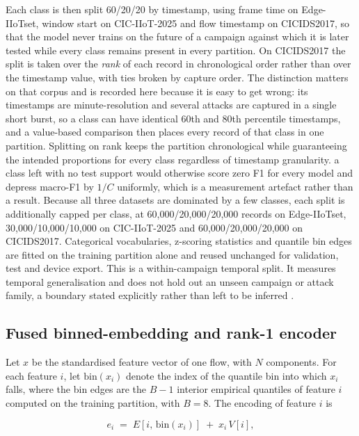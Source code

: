 \documentclass[10pt,letterpaper,twocolumn]{article}
\begin{document}
Each class is then split 60/20/20 by timestamp, using frame time on
Edge-IIoTset, window start on CIC-IIoT-2025 and flow timestamp on CICIDS2017,
so that the model never trains on the future of a campaign against which it is
later tested while every class remains present in every partition. On
CICIDS2017 the split is taken over the \emph{rank} of each record in
chronological order rather than over the timestamp value, with ties broken by
capture order. The distinction matters on that corpus and is recorded here
because it is easy to get wrong: its timestamps are minute-resolution and
several attacks are captured in a single short burst, so a class can have
identical 60th and 80th percentile timestamps, and a value-based comparison
then places every record of that class in one partition. Splitting on rank
keeps the partition chronological while guaranteeing the intended proportions
for every class regardless of timestamp granularity. a class left with no test
support would otherwise score zero F1 for every model and depress macro-F1 by
$1/C$ uniformly, which is a measurement artefact rather than a result. Because
all three datasets are dominated by a few classes, each split is additionally
capped per class, at 60,000/20,000/20,000 records on Edge-IIoTset,
30,000/10,000/10,000 on CIC-IIoT-2025 and 60,000/20,000/20,000 on CICIDS2017. Categorical
vocabularies, z-scoring statistics and quantile bin edges are fitted on the
training partition alone and reused unchanged for validation, test and device
export. This is a within-campaign temporal split. It measures temporal
generalisation and does not hold out an unseen campaign or attack family, a
boundary stated explicitly rather than left to be inferred
\cite{pendlebury2019tesseract}.

\subsection{Fused binned-embedding and rank-1 encoder}
\label{sec:method:encoder}

Let $x$ be the standardised feature vector of one flow, with $N$ components.
For each feature $i$, let $\mathrm{bin}(x_i)$ denote the index of the quantile
bin into which $x_i$ falls, where the bin edges are the $B-1$ interior
empirical quantiles of feature $i$ computed on the training partition, with
$B = 8$. The encoding of feature $i$ is

\begin{equation}
\label{eq:encoder}
e_{i} \;=\; E\!\left[i,\, \mathrm{bin}(x_{i})\right] \;+\; x_{i}\, V\!\left[i\right],
\end{equation}
\end{document}
